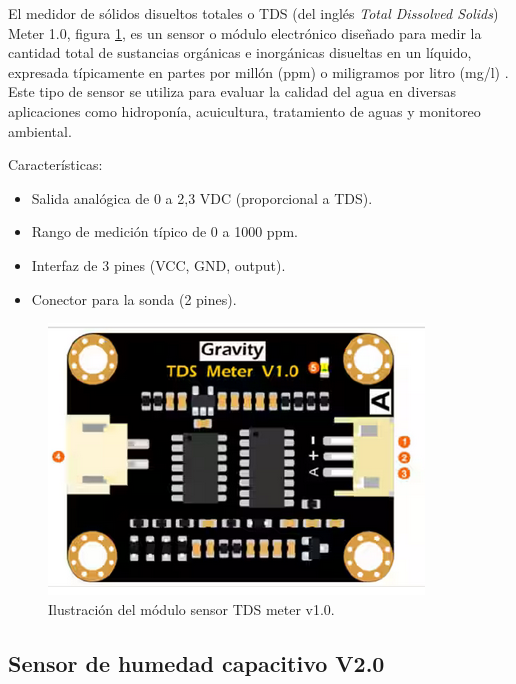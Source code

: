El medidor de sólidos disueltos totales o TDS (del inglés \textit{Total Dissolved Solids}) Meter 1.0, figura \ref{fig:tds}, es un sensor o módulo electrónico diseñado para medir la cantidad total de sustancias orgánicas e inorgánicas disueltas en un líquido, expresada típicamente en partes por millón (ppm) o miligramos por litro (mg/l) \cite{TDS}. Este tipo de sensor se utiliza para evaluar la calidad del agua en diversas aplicaciones como hidroponía, acuicultura, tratamiento de aguas y monitoreo ambiental.

Características:

\begin{itemize}
	\item Salida analógica de 0 a 2,3 VDC (proporcional a TDS).
	\item Rango de medición típico de 0 a 1000 ppm.
	\item Interfaz de 3 pines (VCC, GND, output).
	\item Conector para la sonda (2 pines).
\end{itemize}


\begin{figure}[h]
\centering
\includegraphics[scale=.5]{./Figures/tds.png}
	\caption{Ilustración del módulo sensor TDS meter v1.0\protect\footnotemark.}
	\label{fig:tds}
\end{figure}




\subsection{Sensor de humedad capacitivo V2.0}

